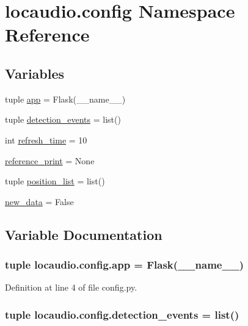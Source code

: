 \hypertarget{namespacelocaudio_1_1config}{\section{locaudio.\-config Namespace Reference}
\label{namespacelocaudio_1_1config}
}
\subsection*{Variables}
\begin{DoxyCompactItemize}
\item 
tuple \hyperlink{namespacelocaudio_1_1config_a360c0d0146f0defa6e852b004d834513}{app} = Flask(\-\_\-\-\_\-name\-\_\-\-\_\-)
\item 
tuple \hyperlink{namespacelocaudio_1_1config_ac701fbe139aea54ed29426657c92739e}{detection\-\_\-events} = list()
\item 
int \hyperlink{namespacelocaudio_1_1config_a7a507b1534e99737ed545a117b87313b}{refresh\-\_\-time} = 10
\item 
\hyperlink{namespacelocaudio_1_1config_a6c08de266870244fd753c8dc6047bfec}{reference\-\_\-print} = None
\item 
tuple \hyperlink{namespacelocaudio_1_1config_afc387e694f7bc08bccf873238760ce8e}{position\-\_\-list} = list()
\item 
\hyperlink{namespacelocaudio_1_1config_aa8acdbffcae328560e4231de29c2dc1a}{new\-\_\-data} = False
\end{DoxyCompactItemize}


\subsection{Variable Documentation}
\hypertarget{namespacelocaudio_1_1config_a360c0d0146f0defa6e852b004d834513}{
\subsubsection[{app}]{\setlength{\rightskip}{0pt plus 5cm}tuple locaudio.\-config.\-app = Flask(\-\_\-\-\_\-name\-\_\-\-\_\-)}}\label{namespacelocaudio_1_1config_a360c0d0146f0defa6e852b004d834513}


Definition at line 4 of file config.\-py.

\hypertarget{namespacelocaudio_1_1config_ac701fbe139aea54ed29426657c92739e}{
\subsubsection[{detection\-\_\-events}]{\setlength{\rightskip}{0pt plus 5cm}tuple locaudio.\-config.\-detection\-\_\-events = list()}}\label{namespacelocaudio_1_1config_ac701fbe139aea54ed29426657c92739e}


